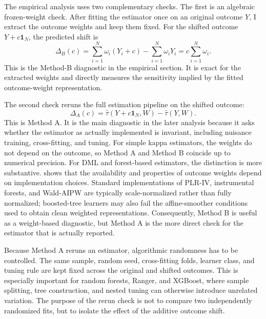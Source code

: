\documentclass{article}
\begin{document}
The empirical analysis uses two complementary checks. The first is an algebraic
frozen-weight check. After fitting the estimator once on an original outcome
\(Y\), I extract the outcome weights and keep them fixed. For the shifted outcome
\(Y+c\mathbf{1}_N\), the predicted shift is
\begin{equation}
    \Delta_B(c)
    =
    \sum_{i=1}^N\omega_i(Y_i+c)-\sum_{i=1}^N\omega_iY_i
    =
    c\sum_{i=1}^N\omega_i .
    \label{eq:method_b}
\end{equation}
This is the Method-B diagnostic in the empirical section. It is exact for the
extracted weights and directly measures the sensitivity implied by the fitted
outcome-weight representation.

The second check reruns the full estimation pipeline on the shifted outcome:
\begin{equation}
    \Delta_A(c)
    =
    \hat\tau(Y+c\mathbf{1}_N,W)-\hat\tau(Y,W).
    \label{eq:method_a}
\end{equation}
This is Method A. It is the main diagnostic in the later analysis because it asks
whether the estimator as actually implemented is invariant, including nuisance
training, cross-fitting, and tuning. For simple kappa estimators, the weights do
not depend on the outcome, so Method A and Method B coincide up to numerical
precision. For DML and forest-based estimators, the distinction is more
substantive. \citet{knaus2024treatment} shows that the availability and
properties of outcome weights depend on implementation choices. Standard
implementations of PLR-IV, instrumental forests, and Wald-AIPW are typically
scale-normalized rather than fully normalized; boosted-tree learners may also
fail the affine-smoother conditions used to obtain clean weighted
representations. Consequently, Method B is useful as a weight-based diagnostic,
but Method A is the more direct check for the estimator that is actually
reported.

Because Method A reruns an estimator, algorithmic randomness has to be controlled.
The same sample, random seed, cross-fitting folds, learner class, and tuning rule
are kept fixed across the original and shifted outcomes. This is especially
important for random forests, Ranger, and XGBoost, where sample splitting, tree
construction, and nested tuning can otherwise introduce unrelated variation. The
purpose of the rerun check is not to compare two independently randomized fits,
but to isolate the effect of the additive outcome shift.
\end{document}
